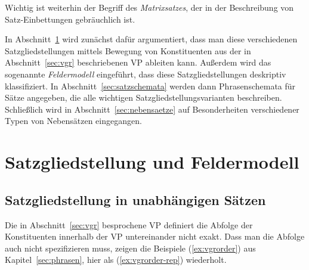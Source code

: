 \begin{exe}
  \ex\label{ex:satz0002} 
  \begin{xlist}
  \end{xlist}
\end{exe}

Wichtig ist weiterhin der Begriff des \textit{Matrixsatzes}, der in der Beschreibung von Satz-Einbettungen gebräuchlich ist.


In Abschnitt~\ref{sec:felder} wird zunächst dafür argumentiert, dass man diese verschiedenen Satzgliedstellungen mittels Bewegung von Konstituenten aus der in Abschnitt~\ref{sec:vgr} beschriebenen VP ableiten kann.
Außerdem wird das sogenannte \textit{Feldermodell} eingeführt, dass diese Satzgliedstellungen deskriptiv klassifiziert.
In Abschnitt~\ref{sec:satzschemata} werden dann Phrasenschemata für Sätze angegeben, die alle wichtigen Satzgliedstellungsvarianten beschreiben.
Schließlich wird in Abschnitt~\ref{sec:nebensaetze} auf Besonderheiten verschiedener Typen von Nebensätzen eingegangen.

\section{Satzgliedstellung und Feldermodell}

\label{sec:felder}

\subsection{Satzgliedstellung in unabhängigen Sätzen}

Die in Abschnitt~\ref{sec:vgr} besprochene VP definiert die Abfolge der Konstituenten innerhalb der VP untereinander nicht exakt.
Dass man die Abfolge auch nicht spezifizieren muss, zeigen die Beispiele (\ref{ex:vgrorder}) aus Kapitel~\ref{sec:phrasen}, hier als (\ref{ex:vgrorder-rep}) wiederholt.

\begin{exe}
  \ex\label{ex:vgrorder-rep}
  \begin{xlist}
    \ex{\ThePhrasenExOne}
    \ex{\ThePhrasenExTwo}
  \end{xlist}
\end{exe}


